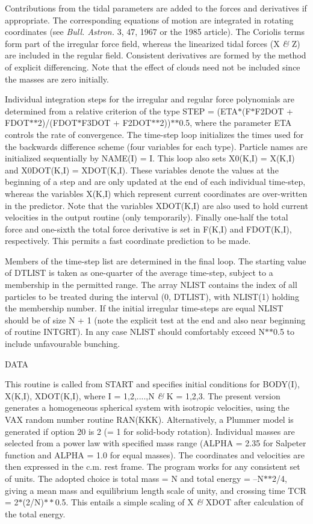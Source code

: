  Contributions from the tidal parameters are added to the forces and
 derivatives if appropriate.  The corresponding equations of motion are
 integrated in rotating coordinates (see {\it Bull. Astron.} 3, 47, 1967 or the
 1985 article).  The
 Coriolis terms form part of the irregular
 force field, whereas the linearized tidal forces (X {\it\&} Z) are included in the
 regular field.  Consistent derivatives are formed by the method of explicit
 differencing.  Note that the effect of clouds need not be included since the
 masses are zero initially.

  Individual integration steps for the irregular and regular force polynomials
 are determined from a relative criterion of the type STEP =
 (ETA$\ast$(F$\ast$F2DOT + FDOT$\ast$$\ast$2)/(FDOT$\ast$F3DOT + F2DOT$\ast$$\ast$2))$\ast$$\ast$0.5,
 where the parameter ETA controls the rate of convergence.  The time-step loop
 initializes the times used for the backwards difference scheme (four variables
 for each type).  Particle names are initialized sequentially by
 NAME(I) = I.  This loop also
 sets X0(K,I) = X(K,I) and X0DOT(K,I) = XDOT(K,I).  These variables denote the
 values at the beginning of a step and are only updated at the end of each
 individual time-step, whereas the variables X(K,I) which represent current
 coordinates are over-written in the predictor.  Note that the variables
 XDOT(K,I) are also used to hold current velocities in the output routine (only
 temporarily).  Finally one-half the total force and one-sixth the total force
 derivative is set in F(K,I) and FDOT(K,I), respectively.  This permits a fast
 coordinate prediction to be made.

 Members of the time-step list are determined in the final loop.  The starting
 value of DTLIST is taken as one-quarter of the average time-step, 
 subject to a membership in the permitted range.  The array
 NLIST contains the index of all particles to be treated during the interval
 (0, DTLIST), with NLIST(1) holding the membership number.  If the initial
 irregular time-steps are equal NLIST should be of size N + 1 (note the
 explicit test at the end and also near beginning of routine INTGRT).  In any
 case NLIST should comfortably exceed N$\ast$$\ast$0.5 to include unfavourable bunching.
\bigskip
\bigskip
\centerline {DATA}
\bigskip

 This routine is called from START and specifies initial conditions for
 BODY(I), X(K,I), XDOT(K,I), where I = 1,2,....,N {\it\&} K = 1,2,3.  The present
 version generates a homogeneous spherical system with isotropic velocities,
 using the VAX random number routine RAN(KKK).  Alternatively, a Plummer 
 model is generated if option 20 is 2 (= 1 for solid-body
 rotation).  Individual masses are selected from a power
 law with specified mass range (ALPHA = 2.35 for Salpeter function and
 ALPHA = 1.0 for equal masses).  The coordinates
 and velocities are then expressed in the c.m. rest frame.  The program works
 for any consistent set of units.  The adopted choice is total mass = N
       and total energy = --N$\ast$$\ast$2/4, giving a 
 mean mass and equilibrium length scale of unity, and crossing
 time TCR = 2$\ast$(2/N)$\ast\ast$0.5.  This entails a simple
 scaling of X {\it\&} XDOT after calculation of the total energy.

